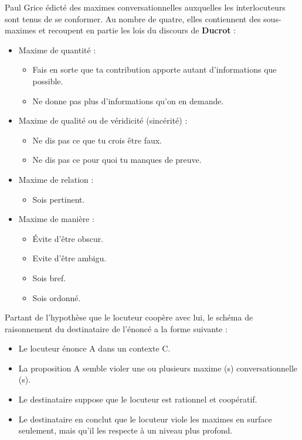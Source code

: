 Paul Grice édicté des maximes conversationnelles auxquelles les interlocuteurs sont tenus de se conformer. Au nombre de quatre, elles contiennent des sous-maximes et recoupent en partie les lois du discours de \textbf{Ducrot} :
\begin{itemize}
\item Maxime de quantité :
\begin{itemize}
\item Fais en sorte que ta contribution apporte autant d’informations que possible.
\item Ne donne pas plus d’informations qu’on en demande.
\end{itemize}
\item Maxime de qualité ou de véridicité (sincérité) :
\begin{itemize}
\item Ne dis pas ce que tu crois être faux.
\item Ne dis pas ce pour quoi tu manques de preuve.
\end{itemize}
\item Maxime de relation :
\begin{itemize}\item Sois pertinent.\end{itemize}
\item Maxime de manière :
\begin{itemize}
\item Évite d’être obscur.
\item Evite d’être ambigu.
\item Sois bref.
\item Sois ordonné.
\end{itemize}
\end{itemize}
Partant de l’hypothèse que le locuteur coopère avec lui, le schéma de raisonnement du destinataire de l’énoncé a la forme suivante :
\begin{itemize}
\item Le locuteur énonce A dans un contexte C.
\item La proposition A semble violer une ou plusieurs maxime (s) conversationnelle (s).
\item Le destinataire suppose que le locuteur est rationnel et coopératif.
\item Le destinataire en conclut que le locuteur viole les maximes en surface seulement, mais qu’il les respecte à un niveau plus profond.
\end{itemize}
